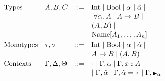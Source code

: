 \begin{figure}[h]
  \centering
  \begin{minipage}{0.5\textwidth}
  \[
      \begin{array}{llcl}
      \text{Types} & A, B, C & \bnfas &
            \Inttype \bnfalt \Booltype \bnfalt \alpha \bnfalt \ahat \bnfalt 
            \\[1pt] &&&\!\!\!\;\;\;
            \alltype{\alpha}{A} \bnfalt A \arr B \bnfalt
            \\[1pt] &&&\!\!\!\;\;
            (A, B) \bnfalt
            \\[1pt] &&&\!\!\!\;\;
            \Unionname[A_1, \dots, A_n]
      \\[2pt]
      \text{Monotypes} & \tau,\sigma & \bnfas &
            \Inttype \bnfalt \Booltype \bnfalt \alpha \bnfalt \ahat \bnfalt 
            \\[1pt] &&&\!\!\!\;\;
            A \arr B \bnfalt (A, B)
        \\[2pt]
      \text{Contexts} & \Gamma, \Delta, \Theta & \bnfas &
                  \cdot
                  \bnfalt \Gamma, \alpha 
                  \bnfalt \Gamma, x:A
                  \\[1pt] &&&\!\!\!\;\;
                  \bnfalt \Gamma, \ahat
                  \bnfalt \Gamma, \hypeq{\ahat}{\tau}
                  \bnfalt \Gamma, \MonnierComma{\ahat}
      \end{array}
  \]
  

\end{minipage}
\end{figure}
